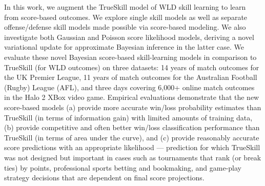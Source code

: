 In this work, we augment the TrueSkill model of WLD skill learning to
learn from score-based outcomes.  We explore single skill models as
well as separate offense/defense skill models made possible via
score-based modeling. We also investigate both Gaussian and Poisson
score likelihood models, deriving a novel variational update for
approximate Bayesian inference in the latter case.  We evaluate these
novel Bayesian score-based skill-learning models in comparison to
TrueSkill (for WLD outcomes) on three datasets: 14 years of match
outcomes for the UK Premier League, 11 years of match outcomes for the
Australian Football (Rugby) League (AFL), and three days covering
6,000+ online match outcomes in the Halo 2 XBox video game.  Empirical
evaluations demonstrate that the new score-based models (a) provide
more accurate win/loss probability estimates than TrueSkill (in terms
of information gain) with limited amounts of training data, (b)
provide competitive and often better win/loss classification
performance than TrueSkill (in terms of area under the curve), and (c)
provide reasonably accurate score predictions with an appropriate
likelihood --- prediction for which TrueSkill was not designed but
important in cases such as tournaments that rank (or break ties) by
points, professional sports betting and bookmaking, and game-play
strategy decisions that are dependent on final score projections.